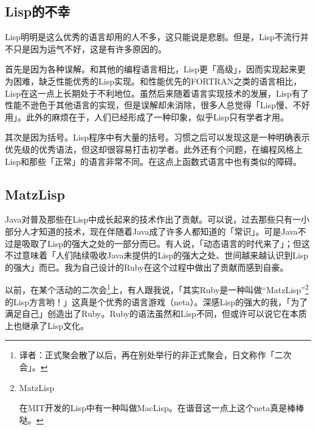 \documentclass[a4paper,12pt]{article}
\begin{document}
\subsection{Lisp的不幸}

Lisp明明是这么优秀的语言却用的人不多，这只能说是悲剧。但是，Lisp不流行并不只是因为运气不好，这是有许多原因的。

首先是因为各种误解。和其他的编程语言相比，Lisp更「高级」，因而实现起来更为困难，缺乏性能优秀的Lisp实现。和性能优先的FORTRAN之类的语言相比，Lisp在这一点上长期处于不利地位。虽然后来随着语言实现技术的发展，Lisp有了性能不逊色于其他语言的实现，但是误解却未消除，很多人总觉得「Lisp慢、不好用」。此外的麻烦在于，人们已经形成了一种印象，似乎Lisp只有学者才用。

其次是因为括号。Lisp程序中有大量的括号。习惯之后可以发现这是一种明确表示优先级的优秀语法，但这却很容易打击初学者。此外还有个问题，在编程风格上Lisp和那些「正常」的语言非常不同。在这点上函数式语言中也有类似的障碍。

\subsection{MatzLisp}

Java对普及那些在Lisp中成长起来的技术作出了贡献。可以说，过去那些只有一小部分人才知道的技术，现在伴随着Java成了许多人都知道的「常识」。可是Java不过是吸取了Lisp的强大之处的一部分而已。有人说，「动态语言的时代来了」；但这不过意味着「人们陆续吸收Java未提供的Lisp的强大之处、世间越来越认识到Lisp的强大」而已。我为自己设计的Ruby在这个过程中做出了贡献而感到自豪。

以前，在某个活动的二次会\footnote{译者：正式聚会散了以后，再在别处举行的非正式聚会，日文称作「二次会」。}上，有人跟我说，「其实Ruby是一种叫做“MatzLisp”\footnote{MatzLisp

  在MIT开发的Lisp中有一种叫做MacLisp。在谐音这一点上这个neta真是棒棒哒。}的Lisp方言哟！」这真是个优秀的语言游戏（neta）。深感Lisp的强大的我，「为了满足自己」创造出了Ruby。Ruby的语法虽然和Lisp不同，但或许可以说它在本质上也继承了Lisp文化。
\end{document}
